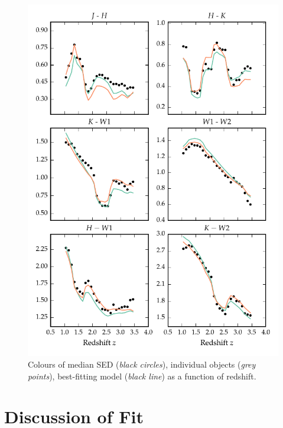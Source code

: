 \begin{figure}
\includegraphics[width=\textwidth]{figures/chapter05/sed_color_plot_2.pdf}
\caption{Colours of median SED ({\it black circles}), individual objects ({\it grey points}), best-fitting  model ({\it black line}) as a function of redshift.}
  \label{fig:color_2}
\end{figure} 

\section{Discussion of Fit}

